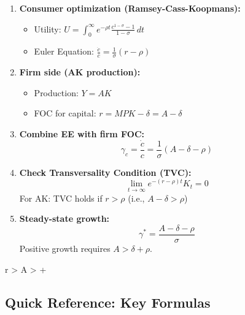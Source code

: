 \begin{enumerate}
    \item \textbf{Consumer optimization (Ramsey-Cass-Koopmans):}
    \begin{itemize}
        \item Utility: $U = \int_0^\infty e^{-\rho t} \frac{c^{1-\sigma} - 1}{1-\sigma} \, dt$
        \item Euler Equation: $\frac{\dot{c}}{c} = \frac{1}{\sigma}(r - \rho)$
    \end{itemize}
    
    \item \textbf{Firm side (AK production):}
    \begin{itemize}
        \item Production: $Y = AK$
        \item FOC for capital: $r = MPK - \delta = A - \delta$
    \end{itemize}
    
    \item \textbf{Combine EE with firm FOC:}
    \[
    \gamma_c = \frac{\dot{c}}{c} = \frac{1}{\sigma}(A - \delta - \rho)
    \]
    
    \item \textbf{Check Transversality Condition (TVC):}
    \[
    \lim_{t \to \infty} e^{-(r-\rho)t} K_t = 0
    \]
    For AK: TVC holds if $r > \rho$ (i.e., $A - \delta > \rho$)
    
    \item \textbf{Steady-state growth:}
    \[
    \gamma^* = \frac{A - \delta - \rho}{\sigma}
    \]
    Positive growth requires $A > \delta + \rho$.
\end{enumerate}

\begin{resultbox}
\quad
{} r > \rho {} A > \delta + \rho\text{)}
\end{resultbox}

\clearpage


\subsection*{Quick Reference: Key Formulas}


